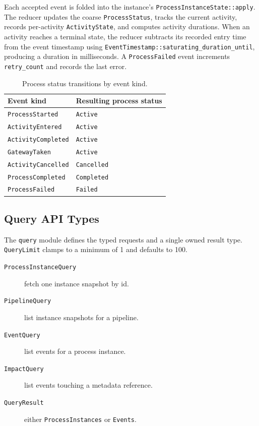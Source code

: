 Each accepted event is folded into the instance's
\texttt{ProcessInstanceState::apply}. The reducer updates the coarse
\texttt{ProcessStatus}, tracks the current activity, records per-activity
\texttt{ActivityState}, and computes activity durations. When an activity
reaches a terminal state, the reducer subtracts its recorded entry time from the
event timestamp using \texttt{EventTimestamp::saturating\_duration\_until},
producing a duration in milliseconds. A \texttt{ProcessFailed} event increments
\texttt{retry\_count} and records the last error.

\begin{table}[htbp]
\centering
\begin{tabular}{ll}
\hline
Event kind & Resulting process status \\
\hline
\texttt{ProcessStarted} & \texttt{Active} \\
\texttt{ActivityEntered} & \texttt{Active} \\
\texttt{ActivityCompleted} & \texttt{Active} \\
\texttt{GatewayTaken} & \texttt{Active} \\
\texttt{ActivityCancelled} & \texttt{Cancelled} \\
\texttt{ProcessCompleted} & \texttt{Completed} \\
\texttt{ProcessFailed} & \texttt{Failed} \\
\hline
\end{tabular}
\caption{Process status transitions by event kind.}
\end{table}

\subsection{Query API Types}

The \texttt{query} module defines the typed requests and a single owned result
type. \texttt{QueryLimit} clamps to a minimum of 1 and defaults to 100.

\begin{description}
\item[\texttt{ProcessInstanceQuery}] fetch one instance snapshot by id.
\item[\texttt{PipelineQuery}] list instance snapshots for a pipeline.
\item[\texttt{EventQuery}] list events for a process instance.
\item[\texttt{ImpactQuery}] list events touching a metadata reference.
\item[\texttt{QueryResult}] either \texttt{ProcessInstances} or \texttt{Events}.
\end{description}

